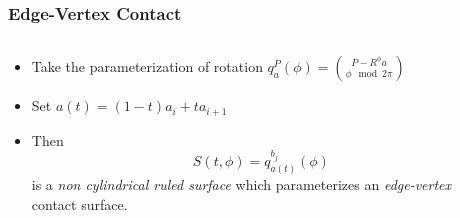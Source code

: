 \documentclass[ucs,9pt,pagenumbers]{beamer}
\begin{document}
\begin{frame}
  \frametitle{Edge-Vertex Contact}
  \begin{columns}[c]
    \begin{column}{0.5\textwidth}
      \begin{minipage}[c][\textheight]{\columnwidth}
        \begin{itemize}
        \item<1-> Take the parameterization of rotation \(q^P_a(\phi) = \binom{P-R^{\phi} a}{\phi \mod 2\pi}\)
        \item<2-> Set \(a(t) = (1-t) a_i + t a_{i+1}\)
        \item<3-> Then \[S(t,\phi)  = q ^{b_j}_{a(t)}(\phi)\] is a \emph{non cylindrical ruled surface} which parameterizes an \emph{edge-vertex} contact surface.
        \end{itemize}
      \end{minipage}
    \end{column}
    \begin{column}{0.45\textwidth}
      \begin{minipage}[c][\textheight]{\columnwidth}
        \centering
      \end{minipage}
    \end{column}
  \end{columns}
\end{frame}
\end{document}
